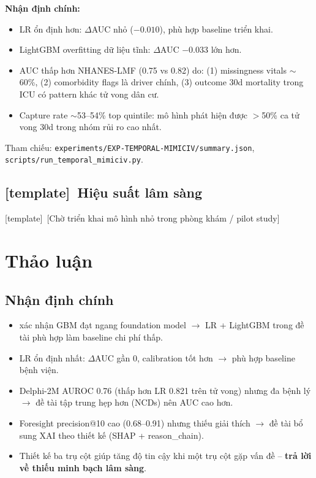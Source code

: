 \documentclass[13pt,a4paper]{article}
\newcommand{\template}{{\color{red}[template]}}
\begin{document}
\textbf{Nhận định chính:}

\begin{itemize}
    \item LR ổn định hơn: $\Delta$AUC nhỏ ($-0.010$), phù hợp baseline triển khai.
    \item LightGBM overfitting dữ liệu tĩnh: $\Delta$AUC $-0.033$ lớn hơn.
    \item AUC thấp hơn NHANES-LMF (0.75 vs 0.82) do: (1) missingness vitals $\sim$60\%, (2) comorbidity flags là driver chính, (3) outcome 30d mortality trong ICU có pattern khác tử vong dân cư.
    \item Capture rate $\sim$53--54\% top quintile: mô hình phát hiện được $>$50\% ca tử vong 30d trong nhóm rủi ro cao nhất.
\end{itemize}

Tham chiếu: \texttt{experiments/EXP-TEMPORAL-MIMICIV/summary.json}, \texttt{scripts/run\_temporal\_mimiciv.py}.

\subsection{\template\ Hiệu suất lâm sàng}

\template\ [Chờ triển khai mô hình nhỏ trong phòng khám / pilot study]

\section{Thảo luận}

\subsection{Nhận định chính}

\begin{itemize}
    \item \cite{guo2024} xác nhận GBM đạt ngang foundation model $\to$ LR + LightGBM trong đề tài phù hợp làm baseline chi phí thấp.
    \item LR ổn định nhất: $\Delta$AUC gần 0, calibration tốt hơn $\to$ phù hợp baseline bệnh viện.
    \item \cite{shmatko2025} Delphi-2M AUROC 0.76 (thấp hơn LR 0.821 trên tử vong) nhưng đa bệnh lý $\to$ đề tài tập trung hẹp hơn (NCDs) nên AUC cao hơn.
    \item \cite{kraljevic2024} Foresight precision@10 cao (0.68--0.91) nhưng thiếu giải thích $\to$ đề tài bổ sung XAI theo thiết kế (SHAP + reason\_chain).
    \item Thiết kế ba trụ cột giúp tăng độ tin cậy khi một trụ cột gặp vấn đề -- \textbf{trả lời \cite{swinckels2024} về thiếu minh bạch lâm sàng}.
\end{itemize}
\end{document}
